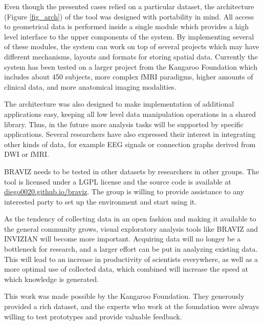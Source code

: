 \documentclass[twocolumn]{svjour3}
\begin{document}
Even though the presented cases relied on a particular dataset, the architecture (Figure \ref{fig_arch}) of the tool was designed with portability in mind. All access to geometrical data is performed inside a single module which provides a high level interface to the upper components of the system. By implementing several of these modules, the system can work on top of several projects which may have different mechanisms, layouts and formats for storing spatial data. Currently the system has been tested on a larger project from the Kangaroo Foundation which includes about 450 subjects, more complex fMRI paradigms, higher amounts of clinical data, and more anatomical imaging modalities.  

The architecture was also designed to make implementation of additional applications easy,  keeping all low level data manipulation operations in a shared library. Thus, in the future more analysis tasks will be supported by specific applications. Several researchers have also expressed their interest in integrating other kinds of data, for example EEG signals or connection graphs \cite{rubinov_complex_2010} derived from DWI or fMRI. 

BRAVIZ needs to be tested in other datasets by researchers in other groups. The tool is licensed under a LGPL license and the source code is available at \url{diego0020.github.io/braviz}. The group is willing to provide assistance to any interested party to set up the environment and start using it. 

As the tendency of collecting data in an open fashion and making it available to the general community grows, visual exploratory analysis tools like BRAVIZ and INVIZIAN will become more important. Acquiring data will no longer be a bottleneck for research, and a larger effort can be put in analyzing existing data. This will lead to an increase in productivity of scientists everywhere, as well as a more optimal use of collected data, which combined will increase the speed at which knowledge is generated.

\begin{acknowledgements}

This work was made possible by the Kangaroo Foundation. They generously provided a rich dataset, and the experts who work at the foundation were always willing to test prototypes and provide valuable feedback.

\end{acknowledgements}

 

\end{document}
